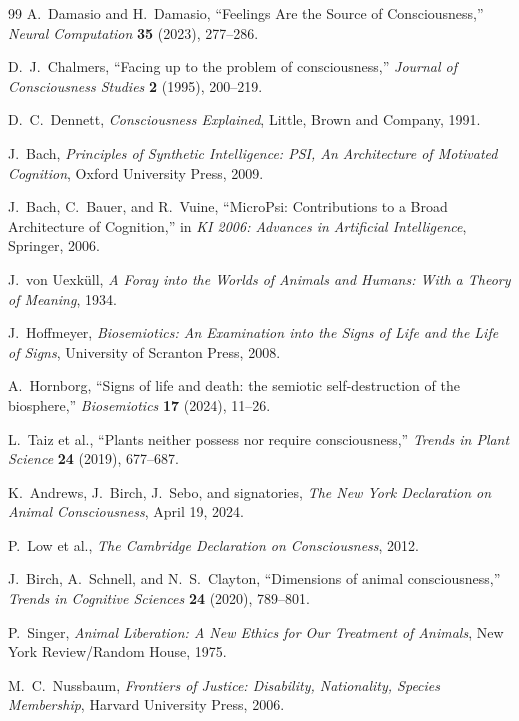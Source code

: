 \documentclass[11pt]{article}
\theoremstyle{remark}
\theoremstyle{plain}
\begin{document}
\begin{thebibliography}{99}
A.\ Damasio and H.\ Damasio,
``Feelings Are the Source of Consciousness,''
\emph{Neural Computation} \textbf{35} (2023), 277--286.

D.\ J.\ Chalmers,
``Facing up to the problem of consciousness,''
\emph{Journal of Consciousness Studies} \textbf{2} (1995), 200--219.

D.\ C.\ Dennett,
\emph{Consciousness Explained},
Little, Brown and Company, 1991.

J.\ Bach,
\emph{Principles of Synthetic Intelligence: PSI, An Architecture of Motivated Cognition},
Oxford University Press, 2009.

J.\ Bach, C.\ Bauer, and R.\ Vuine,
``MicroPsi: Contributions to a Broad Architecture of Cognition,''
in \emph{KI 2006: Advances in Artificial Intelligence},
Springer, 2006.

J.\ von Uexk\"ull,
\emph{A Foray into the Worlds of Animals and Humans: With a Theory of Meaning},
1934.

J.\ Hoffmeyer,
\emph{Biosemiotics: An Examination into the Signs of Life and the Life of Signs},
University of Scranton Press, 2008.

A.\ Hornborg,
``Signs of life and death: the semiotic self-destruction of the biosphere,''
\emph{Biosemiotics} \textbf{17} (2024), 11--26.

L.\ Taiz et al.,
``Plants neither possess nor require consciousness,''
\emph{Trends in Plant Science} \textbf{24} (2019), 677--687.

K.\ Andrews, J.\ Birch, J.\ Sebo, and signatories,
\emph{The New York Declaration on Animal Consciousness},
April 19, 2024.

P.\ Low et al.,
\emph{The Cambridge Declaration on Consciousness},
2012.

J.\ Birch, A.\ Schnell, and N.\ S.\ Clayton,
``Dimensions of animal consciousness,''
\emph{Trends in Cognitive Sciences} \textbf{24} (2020), 789--801.

P.\ Singer,
\emph{Animal Liberation: A New Ethics for Our Treatment of Animals},
New York Review/Random House, 1975.

M.\ C.\ Nussbaum,
\emph{Frontiers of Justice: Disability, Nationality, Species Membership},
Harvard University Press, 2006.


\end{thebibliography}
\end{document}
